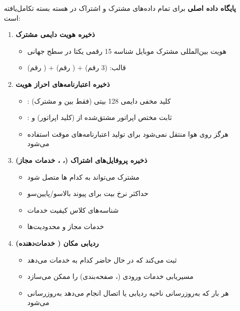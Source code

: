  \textbf{پایگاه داده اصلی} برای تمام داده‌های مشترک و اشتراک در هسته بسته تکامل‌یافته  است:



\begin{enumerate}
\def\labelenumi{\arabic{enumi}.}
\tightlist
\item
  \textbf{ذخیره هویت دایمی مشترک }

  \begin{itemize}
  \tightlist
  \item
    هویت بین‌المللی مشترک موبایل  شناسه 15 رقمی یکتا در سطح جهانی
  \item
    قالب:  (3 رقم) +  ( رقم) +  ( رقم)
  \end{itemize}
\item
  \textbf{ذخیره اعتبارنامه‌های احراز هویت }

  \begin{itemize}
  \tightlist
  \item
    : کلید مخفی دایمی 128 بیتی (فقط بین  و  مشترک)
  \item
    : ثابت مختص اپراتور مشتق‌شده از  (کلید اپراتور) و 
  \item
    هرگز روی هوا منتقل نمی‌شود  برای تولید اعتبارنامه‌های موقت استفاده می‌شود
  \end{itemize}
\item
  \textbf{ذخیره پروفایل‌های اشتراک (، ، خدمات مجاز)}

  \begin{itemize}
  \tightlist
  \item
    مشترک می‌تواند به کدام ها متصل شود
  \item
    حداکثر نرخ بیت  برای پیوند بالاسو/\allowbreak{}پایین‌سو
  \item
    شناسه‌های کلاس کیفیت خدمات 
  \item
    خدمات مجاز و محدودیت‌ها
  \end{itemize}
\item
  \textbf{ردیابی مکان  ( خدمات‌دهنده)}

  \begin{itemize}
  \tightlist
  \item
    ثبت می‌کند که در حال حاضر کدام  به  خدمات می‌دهد
  \item
    مسیریابی خدمات ورودی (، صفحه‌بندی) را ممکن می‌سازد
  \item
    هر بار که  به‌روزرسانی ناحیه ردیابی  یا اتصال انجام می‌دهد به‌روزرسانی می‌شود
  \end{itemize}
\end{enumerate}


